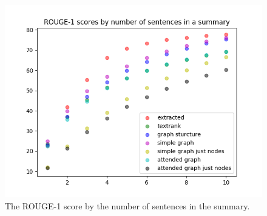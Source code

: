 \begin{figure}[!ht]
	\centering
	\includegraphics[width=150mm, keepaspectratio]{figures/ROUGE_1.png}
	\caption{The ROUGE-1 score  by the number of sentences in the summary.}
	\label{fig:ROUGE-1}
\end{figure}

